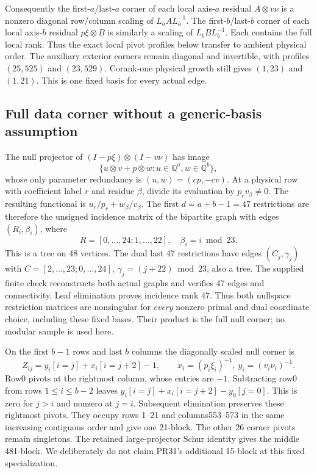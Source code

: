 \documentclass[11pt]{article}
\begin{document}
Consequently the first-$a$/last-$a$ corner of each local axis-$a$ residual
$A\otimes v\nu$ is a nonzero diagonal row/column scaling of $L_aAL_a^{-1}$.
The first-$b$/last-$b$ corner of each local axis-$b$ residual $p\xi\otimes B$
is similarly a scaling of $L_bBL_b^{-1}$. Each contains the full local rank.
Thus the exact local pivot profiles below transfer to ambient physical order.
The auxiliary exterior corners remain diagonal and invertible, with profiles
$(25,525)$ and $(23,529)$. Corank-one physical growth still gives
$(1,23)$ and $(1,21)$. This is one fixed basis for every actual edge.

\subsection{Full data corner without a generic-basis assumption}
The null projector of $(I-p\xi)\otimes(I-v\nu)$ has image
\[
 \{u\otimes v+p\otimes w:u\in\mathbb Q^a,w\in\mathbb Q^b\},
\]
whose only parameter redundancy is $(u,w)=(cp,-cv)$. At a physical row
with coefficient label $r$ and residue $\beta$, divide its evaluation by
$p_rv_\beta\ne0$. The resulting functional is $u_r/p_r+w_\beta/v_\beta$.
The first $d=a+b-1=47$ restrictions are therefore the unsigned incidence
matrix of the bipartite graph with edges $(R_i,\beta_i)$, where
\[
 R=[0,\ldots,24;1,\ldots,22],\quad \beta_i=i\bmod23.
\]
This is a tree on 48 vertices. The dual last 47 restrictions have edges
$(C_j,\gamma_j)$ with
$C=[2,\ldots,23;0,\ldots,24]$, $\gamma_j=(j+22)\bmod23$, also a tree.
The supplied finite check reconstructs both actual graphs and verifies
47 edges and connectivity. Leaf elimination proves incidence rank 47.
Thus both nullspace restriction matrices are nonsingular for \emph{every}
nonzero primal and dual coordinate choice, including these fixed bases.
Their product is the full null corner; no modular sample is used here.

On the first $b-1$ rows and last $b$ columns the diagonally scaled null
corner is
\[
 Z_{ij}=y_i[i=j]+x_i[i=j+2]-1,\qquad
 x_i=(p_i\xi_i)^{-1},\ y_i=(v_i\nu_i)^{-1}.
\]
Row0 pivots at the rightmost column, whose entries are $-1$. Subtracting
row0 from rows $1\le i\le b-2$ leaves
$y_i[i=j]+x_i[i=j+2]-y_0[j=0]$. This is zero for $j>i$ and nonzero at $j=i$.
Subsequent elimination preserves these rightmost pivots. They occupy rows
1--21 and columns553--573 in the same increasing contiguous order and
give one 21-block. The other 26 corner pivots remain singletons. The retained
large-projector Schur identity gives the middle 481-block. We deliberately
do not claim PR31's additional 15-block at this fixed specialization.
\end{document}
